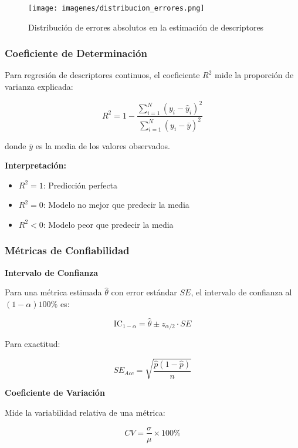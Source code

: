 \begin{figure}[h]
\centering
\texttt{[image: imagenes/distribucion\_errores.png]}
\caption{Distribución de errores absolutos en la estimación de descriptores}
\label{fig:errores}
\end{figure}

\subsubsection{Coeficiente de Determinación}

Para regresión de descriptores continuos, el coeficiente $R^2$ mide la proporción de varianza explicada:

\begin{equation}
R^2 = 1 - \frac{\sum_{i=1}^{N}(y_i - \hat{y}_i)^2}{\sum_{i=1}^{N}(y_i - \bar{y})^2}
\end{equation}

donde $\bar{y}$ es la media de los valores observados.

\textbf{Interpretación:}
\begin{itemize}
\item $R^2 = 1$: Predicción perfecta
\item $R^2 = 0$: Modelo no mejor que predecir la media
\item $R^2 < 0$: Modelo peor que predecir la media
\end{itemize}

\subsubsection{Métricas de Confiabilidad}

\textbf{Intervalo de Confianza}

Para una métrica estimada $\hat{\theta}$ con error estándar $SE$, el intervalo de confianza al $(1-\alpha)100\%$ es:

\begin{equation}
\text{IC}_{1-\alpha} = \hat{\theta} \pm z_{\alpha/2} \cdot SE
\end{equation}

Para exactitud:

\begin{equation}
SE_{Acc} = \sqrt{\frac{\hat{p}(1-\hat{p})}{n}}
\end{equation}

\textbf{Coeficiente de Variación}

Mide la variabilidad relativa de una métrica:

\begin{equation}
CV = \frac{\sigma}{\mu} \times 100\%
\end{equation}

